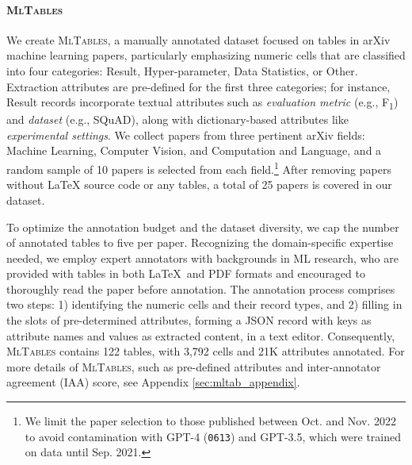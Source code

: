 \documentclass[11pt]{article}
\newcommand\data{\textsc{MlTables}}
\begin{document}
\paragraph{\data{}} We create \data{}, a manually annotated dataset 
focused on tables in arXiv machine learning papers, particularly emphasizing numeric cells that are classified into four categories: Result, Hyper-parameter, Data Statistics, or Other. Extraction attributes are pre-defined for the first three categories; for instance, Result records incorporate textual 
attributes such as \textit{evaluation metric} (e.g., F\textsubscript{1}) and \textit{dataset} (e.g., SQuAD), along with dictionary-based attributes like \textit{experimental settings}. 
We collect papers from three pertinent arXiv fields: Machine Learning, Computer Vision, and Computation and Language, and a random sample of 10 papers is selected from each field.\footnote{We limit the paper selection to those published between Oct. and Nov. 2022 to avoid contamination with GPT-4 (\texttt{0613}) and GPT-3.5, which were trained on data until Sep. 2021.} After removing papers without \LaTeX{} source code or any tables, a total of 25 papers is covered in our dataset. 





To optimize the annotation budget and the dataset diversity, we cap the number of annotated tables to five per paper. Recognizing the domain-specific expertise needed, we employ expert annotators with backgrounds in ML research, who are provided with tables in both \LaTeX~and PDF formats and encouraged to thoroughly read the paper before annotation. The annotation process comprises two steps: 1) identifying the numeric cells and their record types, and 2) filling in the slots of pre-determined attributes, forming a JSON record with keys as attribute names and values as extracted content, in a text editor. Consequently, \data{} contains 122 tables, with 3,792 cells and 21K attributes annotated. For more details of \data{}, such as pre-defined attributes and inter-annotator agreement (IAA) score, see Appendix \ref{sec:mltab_appendix}.




\newcommand{\subfifty}[1]{$\text{#1}_{50}$}
\newcommand{\icfifty}{\subfifty{IC}}
\end{document}
